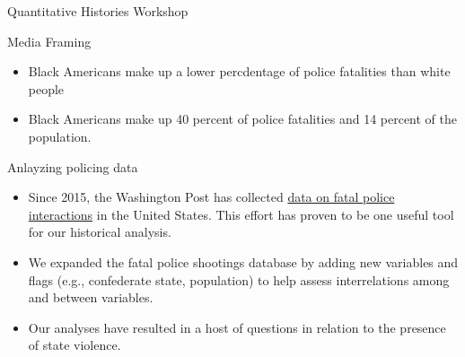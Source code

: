 \documentclass[
  ignorenonframetext,
]{beamer}
\begin{document}
\begin{frame}[fragile]{Quantitative Histories Workshop}
\begin{block}{Media Framing}
\begin{itemize}[<+->]
  \begin{itemize}[<+->]
  \item
    Black Americans make up a lower percdentage of police fatalities
    than white people
  \item
    Black Americans make up 40 percent of police fatalities and 14
    percent of the population.
  \end{itemize}
\end{itemize}
\end{block}

\begin{block}{Anlayzing policing data}
\protect\hypertarget{anlayzing-policing-data}{}
\begin{itemize}[<+->]
\item
  Since 2015, the Washington Post has collected
  \href{https://www.washingtonpost.com/graphics/investigations/police-shootings-database/}{data
  on fatal police interactions} in the United States. This effort has
  proven to be one useful tool for our historical analysis.
\item
  We expanded the fatal police shootings database by adding new
  variables and flags (e.g., confederate state, population) to help
  assess interrelations among and between variables.
\item
  Our analyses have resulted in a host of questions in relation to the
  presence of state violence.
\end{itemize}

\pause

\end{block}


\end{frame}
\end{document}
